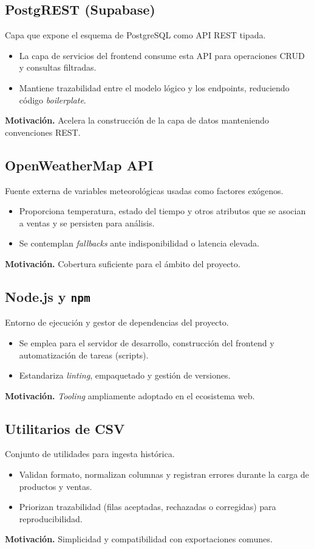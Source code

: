 \subsection{PostgREST (Supabase)}
Capa que expone el esquema de PostgreSQL como API REST tipada.
\begin{itemize}
    \item La capa de servicios del frontend consume esta API para operaciones CRUD y consultas filtradas.
    \item Mantiene trazabilidad entre el modelo lógico y los endpoints, reduciendo código \textit{boilerplate}.
\end{itemize}
\noindent\textbf{Motivación.} Acelera la construcción de la capa de datos manteniendo convenciones REST.

\subsection{OpenWeatherMap API}
Fuente externa de variables meteorológicas usadas como factores exógenos.
\begin{itemize}
    \item Proporciona temperatura, estado del tiempo y otros atributos que se asocian a ventas y se persisten para análisis.
    \item Se contemplan \textit{fallbacks} ante indisponibilidad o latencia elevada.
\end{itemize}
\noindent\textbf{Motivación.} Cobertura suficiente para el ámbito del proyecto.

\subsection{Node.js y \texttt{npm}}
Entorno de ejecución y gestor de dependencias del proyecto.
\begin{itemize}
    \item Se emplea para el servidor de desarrollo, construcción del frontend y automatización de tareas (scripts).
    \item Estandariza \textit{linting}, empaquetado y gestión de versiones.
\end{itemize}
\noindent\textbf{Motivación.} \textit{Tooling} ampliamente adoptado en el ecosistema web.

\subsection{Utilitarios de CSV}
Conjunto de utilidades para ingesta histórica.
\begin{itemize}
    \item Validan formato, normalizan columnas y registran errores durante la carga de productos y ventas.
    \item Priorizan trazabilidad (filas aceptadas, rechazadas o corregidas) para reproducibilidad.
\end{itemize}
\noindent\textbf{Motivación.} Simplicidad y compatibilidad con exportaciones comunes.

